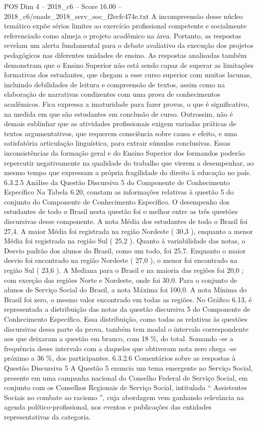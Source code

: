 \begin{textsample}{POS Dim 4 – 2018\_c6 – Score 16.00 – 2018\_c6/enade\_2018\_serv\_soc\_f2ecfc474e.txt}
A incompreensão desse núcleo temático expõe sérios limites ao exercício profissional competente e socialmente referenciado como almeja o projeto acadêmico na área.
Portanto, as respostas revelam um alerta fundamental para o debate avaliativo da execução dos projetos pedagógicos nas diferentes unidades de ensino.
As respostas analisadas também demonstram que o Ensino Superior não está sendo capaz de superar as limitações formativas dos estudantes, que chegam a esse curso superior com muitas lacunas, incluindo debilidades de leitura e compreensão de textos, assim como na elaboração de narrativas condizentes com uma prova de conhecimentos acadêmicos.
Fica expressa a imaturidade para fazer provas, o que é significativo, na medida em que são estudantes em conclusão de curso.
Outrossim, não é demais sublinhar que as atividades profissionais exigem variadas práticas de textos argumentativos, que requerem consciência sobre causa e efeito, e uma satisfatória articulação linguística, para extrair súmulas conclusivas.
Essas inconsistências da formação geral e do Ensino Superior dos formandos poderão repercutir negativamente na qualidade do trabalho que vierem a desempenhar, ao mesmo tempo que expressam a própria fragilidade do direito à educação no país. 6.3.2.5 Análise da Questão Discursiva 5 do Componente de Conhecimento Específico Na Tabela 6.20, constam as informações relativas à questão 5 do conjunto do Componente de Conhecimento Específico.
O desempenho dos estudantes de todo o Brasil nesta questão foi o melhor entre as três questões discursivas desse componente.
A nota Média dos estudantes de todo o Brasil foi 27,4.
A maior Média foi registrada na região Nordeste ( 30,3 ), enquanto a menor Média foi registrada na região Sul ( 25,2 ).
Quanto à variabilidade das notas, o Desvio padrão dos alunos do Brasil, como um todo, foi 25,7.
Enquanto o maior desvio foi encontrado na região Nordeste ( 27,0 ), o menor foi encontrado na região Sul ( 23,6 ).
A Mediana para o Brasil e na maioria das regiões foi 20,0 ; com exceção das regiões Norte e Nordeste, onde foi 30,0.
Para o conjunto de alunos de Serviço Social do Brasil, a nota Máxima foi 100,0.
A nota Mínima do Brasil foi zero, o mesmo valor encontrado em todas as regiões.
No Gráfico 6.13, é representada a distribuição das notas da questão discursiva 5 do Componente de Conhecimento Específico.
Essa distribuição, como todas as relativas às questões discursivas dessa parte da prova, também tem modal o intervalo correspondente aos que deixaram a questão em branco, com 18 \%, do total.
Somando -se a frequência desse intervalo com a daqueles que obtiveram nota zero chega -se próximo a 36 \%, dos participantes. 6.3.2.6 Comentários sobre as respostas à Questão Discursiva 5 A Questão 5 enuncia um tema emergente no Serviço Social, presente em uma campanha nacional do Conselho Federal de Serviço Social, em conjunto com os Conselhos Regionais de Serviço Social, intitulada “ Assistentes Sociais no combate ao racismo ”, cuja abordagem vem ganhando relevância na agenda político-profissional, nos eventos e publicações das entidades representativas da categoria.

\end{textsample}
